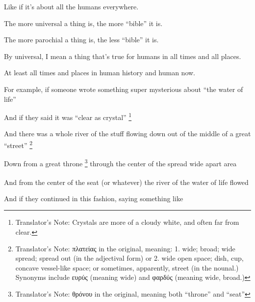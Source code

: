{{                Like if it's about all the humans everywhere.

				The more universal a thing is, the more ``bible'' it is.

				The more parochial a thing is, the less ``bible'' it is.

				By universal, I mean a thing that's true for humans in all times and all places.
				
				At least all times and places in human history and human now.

                For example, if someone wrote something super mysterious about ``the water of life''

                And if they said it was ``clear as crystal''%
                \footnote{%
                    Translator's Note: Crystals are more of a cloudy white,
                    and often far from clear.
                }%

                And there was a whole river of the stuff flowing down out of the middle of a great ``street''%
                \footnote{
                    Translator's Note: πλατείας in the original, meaning:
                    1. wide; broad; wide spread; spread out (in the adjectival form) or
                    2. wide open space; dish, cup, concave vessel-like space;
                       or sometimes, apparently, street (in the nounal.)
                    Synonyms include ευρύς (meaning wide) and φαρδύς (meaning wide, broad.)
                }\xdef\fnstreet{\thefootnote}%

                Down from a great throne%
                \footnote{
                    Translator's Note: θρόνου in the original, meaning both ``throne'' and ``seat''
                }\xdef\fnseat{\thefootnote}
                through the center of the spread wide apart area\textsuperscript{\fnstreet}

                And from the center of the seat\textsuperscript{\fnseat}
                (or whatever) the river of the water of life flowed

                And if they continued in this fashion, saying something like

}}
